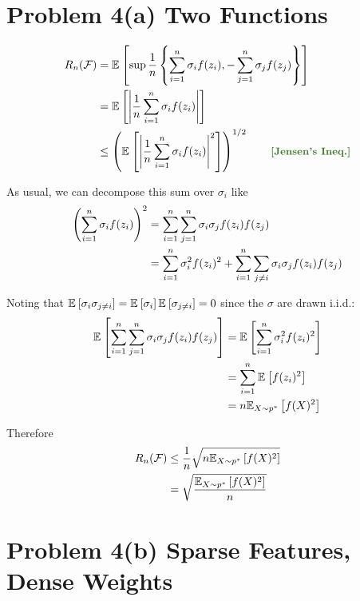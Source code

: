 \documentclass[11pt]{article}
\newcommand{\1}{\mathbb{I}} %
\begin{document}
\clearpage 
\section*{Problem 4(a) Two Functions}


\begin{align}
	R_n(\mathcal F)
		&= \E{ \sup \inv{n} \left\{     \insum \sigma_i f(z_i), - \jnsum \sigma_j f(z_j)  \right\}  } \\
		&= \E{  \left|   \inv{n} \insum \sigma_i f(z_i) \right| } \\
		&\leq \lr{  \E{  \left|   \inv{n} \insum \sigma_i f(z_i) \right|^2}    }^{1/2} \qquad \mtgreen{[Jensen's Ineq.]}
\end{align}

As usual, we can decompose this sum over $\sigma_i$ like
\begin{align}
	\lr{ \insum \sigma_i f(z_i)  }^2 
		&= \insum \jnsum \sigma_i \sigma_j f(z_i) f(z_j) \\
		&= \insum \sigma_i^2 f(z_i)^2 + \insum \sum_{j \neq i} \sigma_i \sigma_j f(z_i) f(z_j)
\end{align}

Noting that $\E{\sigma_i \sigma_{j \neq i} } = \E{\sigma_i}  \E{\sigma_{j  \neq i } } = 0$ since the $\sigma$ are drawn i.i.d.: 
\begin{align}
	\E{\insum \jnsum \sigma_i \sigma_j f(z_i) f(z_j)}
		&= \E{\insum \sigma_i^2 f(z_i)^2 } \\
		&= \insum \E{f(z_i)^2} \\
		&= n \E[X \sim p^*]{f(X)^2}
\end{align}

Therefore 
\begin{align}
	R_n(\mathcal F) 
		&\leq \inv{n} \sqrt{n \E[X \sim p^*]{f(X)^2}} \\
		&= \sqrt{\frac{\E[X \sim p^*]{f(X)^2}}{n}}
\end{align}



\clearpage 
\section*{Problem 4(b) Sparse Features, Dense Weights}
\end{document}
